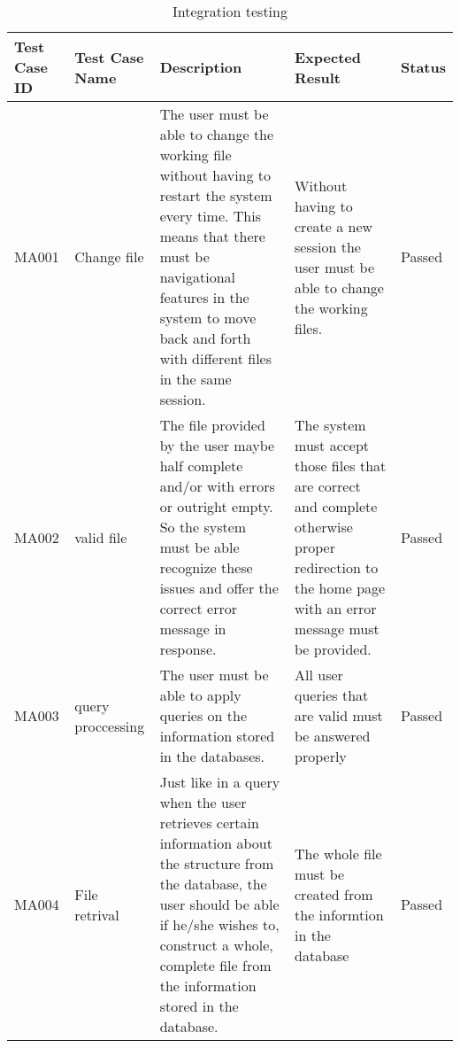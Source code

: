 \begin{table}
\begin{tabular}{|p{1.5cm}|p{2cm}|p{5cm}|p{5cm}|p{1.5cm}|} 
\hline
Test Case ID & Test Case Name & Description & Expected Result
 & Status \\ 

  
  \hline \rule[-2ex]{0pt}{5.5ex}  MA001 & Change file &
   The user must be able to change the working file without having to restart the system every time. This means that there must be navigational features in the system to move back and forth with different files in the same session.
   & Without having to create a new session the user must be able to change the working files.
   &
   Passed \\
   \hline

   \rule[-2ex]{0pt}{5.5ex}  MA002 & valid file
   &
   The file provided by the user maybe half complete and/or with errors or outright empty. So the system must be able recognize these issues and offer the correct error message in response.
   & The system must accept those files that are correct and complete otherwise proper redirection to the home page with an error message must be provided.

   &
   Passed \\

   \hline
    
    \rule[-2ex]{0pt}{5.5ex}  MA003 & query proccessing
    &
    The user must be able to apply queries on the information stored in the databases. 
    &
    All user queries that are valid must be answered properly
    &
    Passed \\
     
      \hline
       \rule[-2ex]{0pt}{5.5ex}  MA004 & File retrival
        & 
         Just like in a query when the user retrieves certain information about the structure from the database, the user should be able if he/she wishes to, construct a whole, complete file from the information stored in the database.
          
           & The whole file must be created from the informtion in the database &
            Passed \\
              

              \hline

              \end{tabular}

\caption{Integration testing}
              \end{table}
